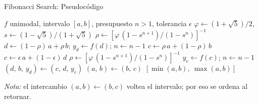 \begin{frame}{Fibonacci Search: Pseudocódigo}
    \scriptsize
    \begin{algorithmic}[1]
        \Require $f$ unimodal, intervalo $[a,b]$, presupuesto $n>1$, tolerancia $\epsilon$
        \State $\varphi \gets (1+\sqrt{5})/2$, \quad $s \gets (1-\sqrt{5})/(1+\sqrt{5})$
        \State $\rho \gets \left[\varphi\,(1-s^{n+1})/(1-s^{n})\right]^{-1}$
        \State $d \gets (1-\rho)\,a + \rho\, b$; \quad $y_d \gets f(d)$; \quad $n \gets n-1$
                \State $c \gets \rho\, a + (1-\rho)\, b$ 
            \Else
                \State $c \gets \epsilon\, a + (1-\epsilon)\, d$ 
            \EndIf
            \State $\rho \gets \left[\varphi\,(1-s^{n+1})/(1-s^{n})\right]^{-1}$
            \State $y_c \gets f(c)$; \quad $n \gets n-1$
                \State $(d,\, b,\, y_d) \gets (c,\, d,\, y_c)$ 
            \Else
                \State $(a,\, b) \gets (b,\, c)$ 
            \EndIf
        \EndWhile
        \State \Return $[\min(a,b),\ \max(a,b)]$
    \end{algorithmic}
    \vspace{0.3em}
    {\tiny \textit{Nota:} el intercambio $(a,b)\gets(b,c)$ voltea el intervalo; por eso se ordena al retornar.}
\end{frame}

